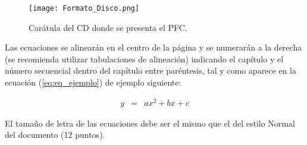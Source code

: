 \begin{figure}[h]
	\centering
	\texttt{[image: Formato\_Disco.png]}
	\caption{Carátula del CD donde se presenta el PFC.}
	\label{fig:Formato_Disco}
\end{figure}  

Las ecuaciones se alinearán en el centro de la página y se numerarán a la derecha (se recomienda utilizar tabulaciones de alineación) indicando el capítulo y el número secuencial dentro del capítulo entre paréntesis, tal y como aparece en la ecuación (\ref{eq:eq_ejemplo}) de ejemplo siguiente:

\begin{eqnarray}
\label{eq:eq_ejemplo}
y & = & ax^2 + bx + c
\end{eqnarray}

El tamaño de letra de las ecuaciones debe ser el mismo que el del estilo Normal del documento (12 puntos).

